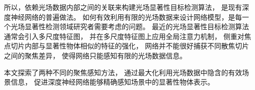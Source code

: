


所以，依赖光场数据内部之间的关联来构建光场显著性目标检测算法，
是现有深度神经网络的普遍做法。
如何有效利用有限的光场数据来设计网络模型，是每一个光场显著性检测领域研究者需要考虑的问题。
最近的光场显著性目标检测算法通常会引入多尺度特征图，
并在多尺度特征图上应用全局注意力机制，
侧重对焦点切片内部与显著性物体相似的特征的强化，
网络并不能很好捕获不同散焦切片之间的聚焦差异，
使得网络只能感知有限的光场数据信息。






本文探索了两种不同的聚焦感知方法，
通过最大化利用光场数据中隐含的有效场景信息，
促进深度神经网络能够精确感知场景中的显著性物体表示。





%
%



